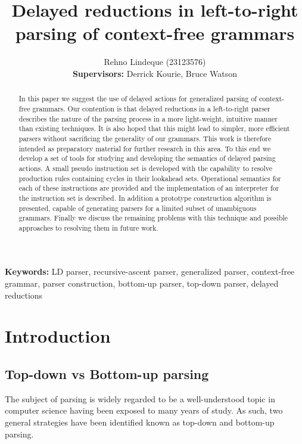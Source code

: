\documentclass[envcountsame,runningheads]{llncs}
\begin{document}
\title{Delayed reductions in left-to-right parsing of context-free grammars}
\author{Rehno Lindeque (23123576)\\
\textbf{Supervisors:} Derrick Kourie, Bruce Watson}

\maketitle

\begin{abstract}
In this paper we suggest the use of delayed actions for generalized parsing of context-free grammars.
Our contention is that delayed reductions in a left-to-right parser describes the nature of the parsing process in a more light-weight, intuitive manner than existing techniques.
It is also hoped that this might lead to simpler, more efficient parsers without sacrificing the generality of our grammars.
This work is therefore intended as preparatory material for further research in this area.
To this end we develop a set of tools for studying and developing the semantics of delayed parsing actions.
A small pseudo instruction set is developed with the capability to resolve production rules containing cycles in their lookahead sets.
Operational semantics for each of these instructions are provided and the implementation of an interpreter for the instruction set is described.
In addition a prototype construction algorithm is presented, capable of generating parsers for a limited subset of unambiguous grammars.
Finally we discuss the remaining problems with this technique and possible approaches to resolving them in future work.\\
\end{abstract}

\textbf{Keywords:} LD parser, recursive-ascent parser, generalized parser, context-free grammar, parser construction, bottom-up parser, top-down parser, delayed reductions

\section{Introduction}

\subsection{Top-down vs Bottom-up parsing}

The subject of parsing is widely regarded to be a well-understood topic in computer science having been exposed to many years of study.
As such, two general strategies have been identified known as top-down and bottom-up parsing.
\end{document}
